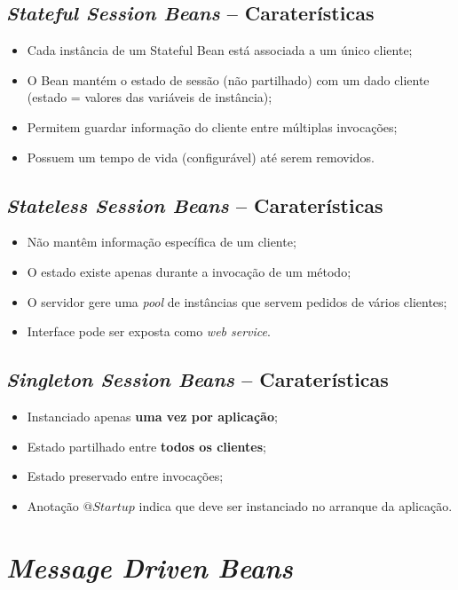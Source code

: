 \documentclass{article}
\begin{document}
\subsection{\textit{Stateful Session Beans} -- Caraterísticas}

\begin{itemize}
	\item Cada instância de um Stateful Bean está associada a um único cliente;
	\item O Bean mantém o estado de sessão (não partilhado) com um dado cliente (estado = valores das variáveis de instância);
	\item Permitem guardar informação do cliente entre múltiplas invocações;
	\item Possuem um tempo de vida (configurável) até serem removidos.
\end{itemize}

\subsection{\textit{Stateless Session Beans} -- Caraterísticas}

\begin{itemize}
	\item Não mantêm informação específica de um cliente;
	\item O estado existe apenas durante a invocação de um método;
	\item O servidor gere uma \textit{pool} de instâncias que servem pedidos de vários clientes;
	\item Interface pode ser exposta como \textit{web service}.
\end{itemize}

\subsection{\textit{Singleton Session Beans} -- Caraterísticas}

\begin{itemize}
	\item Instanciado apenas \textbf{uma vez por aplicação};
	\item Estado partilhado entre \textbf{todos os clientes};
	\item Estado preservado entre invocações;
	\item Anotação $@Startup$ indica que deve ser instanciado no arranque da aplicação.
\end{itemize}

\section{\textit{Message Driven Beans}}
\end{document}
